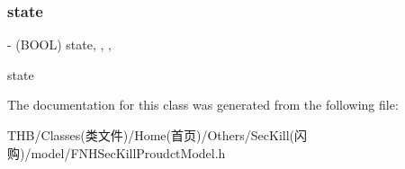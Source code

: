 \subsubsection{\texorpdfstring{state}{state}}
{\footnotesize\ttfamily -\/ (B\+O\+OL) state\hspace{0.3cm}{\ttfamily [read]}, {\ttfamily [write]}, {\ttfamily [nonatomic]}, {\ttfamily [assign]}}

state 

The documentation for this class was generated from the following file\+:\begin{DoxyCompactItemize}
\item 
T\+H\+B/\+Classes(类文件)/\+Home(首页)/\+Others/\+Sec\+Kill(闪购)/model/F\+N\+H\+Sec\+Kill\+Proudct\+Model.\+h\end{DoxyCompactItemize}

